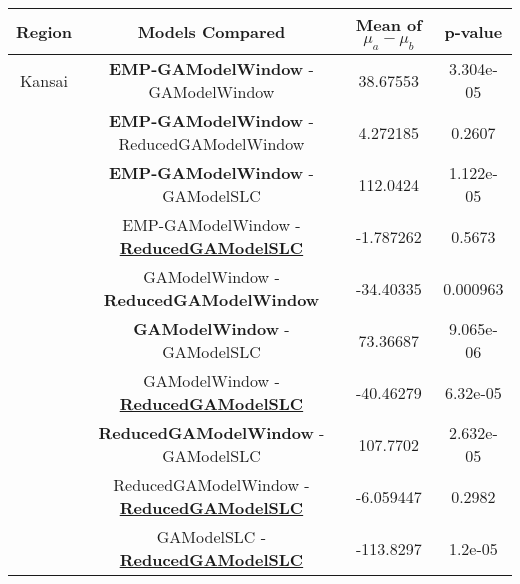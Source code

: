 \begin{table*}[]
  \begin{center}
    \begin{tabular}{|c|c|c|c|}
      \hline
      \multicolumn{1}{|c|}{Region} &
      \multicolumn{1}{|c|}{Models Compared} & \multicolumn{1}{|c|}{Mean of $\mu_a - \mu_b$}&
      \multicolumn{1}{|c|}{p-value} \\
      \hline
      
      Kansai & \textbf{EMP-GAModelWindow} - GAModelWindow &
      38.67553 &  3.304e-05 \\
      
      & \textbf{EMP-GAModelWindow} - ReducedGAModelWindow & 4.272185  & 0.2607\\
      
      & \textbf{EMP-GAModelWindow} - GAModelSLC & 
      112.0424 &  1.122e-05\\
      
      &EMP-GAModelWindow - \underline{\textbf{ReducedGAModelSLC}} &  
      -1.787262 & 0.5673 \\
      
      & GAModelWindow - \textbf{ReducedGAModelWindow} &
      -34.40335 & 0.000963\\
      
      & \textbf{GAModelWindow} - GAModelSLC &
      73.36687  &9.065e-06\\
      
      & GAModelWindow - \underline{\textbf{ReducedGAModelSLC}} &
      -40.46279 & 6.32e-05\\
      
      & \textbf{ReducedGAModelWindow} - GAModelSLC &
      107.7702  & 2.632e-05\\
      
      & ReducedGAModelWindow - \underline{\textbf{ReducedGAModelSLC}} &
      -6.059447 &0.2982\\
      
      & GAModelSLC - \underline{\textbf{ReducedGAModelSLC}} &
      -113.8297 & 1.2e-05\\
      

\end{tabular}
\end{center}
\end{table*}
